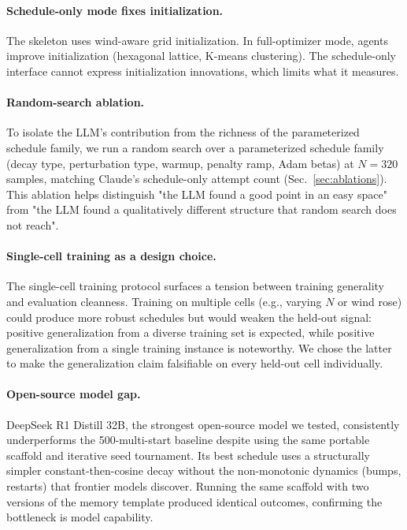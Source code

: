 \paragraph{Schedule-only mode fixes initialization.}
The skeleton uses wind-aware grid initialization. In full-optimizer
mode, agents improve initialization (hexagonal lattice, K-means
clustering). The schedule-only interface cannot express initialization
innovations, which limits what it measures.

\paragraph{Random-search ablation.}
To isolate the LLM's contribution from the richness of the
parameterized schedule family, we run a random search over a
parameterized schedule family (decay type, perturbation type,
warmup, penalty ramp, Adam betas) at $N=320$ samples, matching
Claude's schedule-only attempt count (Sec.~\ref{sec:ablations}).
This ablation helps distinguish "the LLM found a good point in an
easy space" from "the LLM found a qualitatively different structure
that random search does not reach".

\paragraph{Single-cell training as a design choice.}
The single-cell training protocol surfaces a tension between
training generality and evaluation cleanness. Training on multiple
cells (e.g., varying $N$ or wind rose) could produce more robust
schedules but would weaken the held-out signal: positive
generalization from a diverse training set is expected, while
positive generalization from a single training instance is
noteworthy. We chose the latter to make the generalization claim
falsifiable on every held-out cell individually.

\paragraph{Open-source model gap.}
DeepSeek R1 Distill 32B, the strongest open-source model we
tested, consistently underperforms the 500-multi-start baseline
despite using the same portable scaffold and iterative seed
tournament. Its best schedule uses a structurally simpler
constant-then-cosine decay without the non-monotonic dynamics
(bumps, restarts) that frontier models discover. Running the
same scaffold with two versions of the memory template produced
identical outcomes, confirming the bottleneck is model capability.

